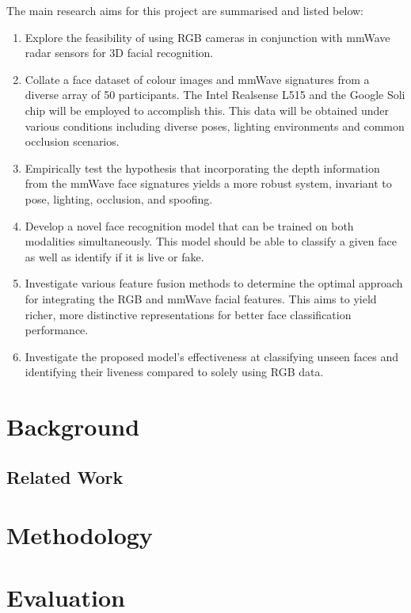 \documentclass{mpaper}
\begin{document}
The main research aims for this project are summarised and listed below:

\begin{enumerate}
    \item Explore the feasibility of using RGB cameras in conjunction with mmWave radar sensors for 3D facial recognition.
    \item Collate a face dataset of colour images and mmWave signatures from a diverse array of 50 participants. The Intel Realsense L515 \cite{intel-l515} and the Google Soli chip \cite{lien2016soli} will be employed to accomplish this. This data will be obtained under various conditions including diverse poses, lighting environments and common occlusion scenarios.
    \item Empirically test the hypothesis that incorporating the depth information from the mmWave face signatures yields a more robust system, invariant to pose, lighting, occlusion, and spoofing.
    \item Develop a novel face recognition model that can be trained on both modalities simultaneously. This model should be able to classify a given face as well as identify if it is live or fake.
    \item Investigate various feature fusion methods to determine the optimal approach for integrating the RGB and mmWave facial features. This aims to yield richer, more distinctive representations for better face classification performance.
    \item Investigate the proposed model's effectiveness at classifying unseen faces and identifying their liveness compared to solely using RGB data.
\end{enumerate}


\section{Background}

\subsection{Related Work}



\section{Methodology}



\section{Evaluation}
\end{document}
